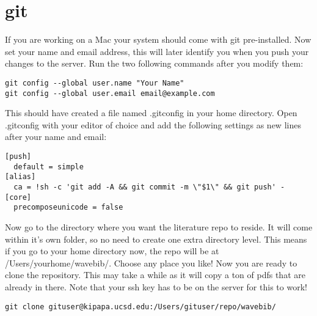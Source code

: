 \documentclass[11pt, oneside]{article}   	%
\begin{document}
\section{git}
If you are working on a Mac your system should come with git pre-installed. Now set your name and email address, this will later identify you when you push your changes to the server. Run the two following commands after you modify them:
\begin{verbatim}
git config --global user.name "Your Name"
git config --global user.email email@example.com
\end{verbatim}
This should have created a file named .gitconfig in your home directory. Open .gitconfig with your editor of choice and add the following settings as new lines after your name and email:
\begin{verbatim}
[push]
  default = simple
[alias]
  ca = !sh -c 'git add -A && git commit -m \"$1\" && git push' -
[core]
  precomposeunicode = false
\end{verbatim}

Now go to the directory where you want the literature repo to reside. It will come within it's own folder, so no need to create one extra directory level. This means if you go to your home directory now, the repo will be at /Users/yourhome/wavebib/. Choose any place you like! Now you are ready to clone the repository. This may take a while as it will copy a ton of pdfs that are already in there. Note that your ssh key has to be on the server for this to work!
\begin{verbatim}
git clone gituser@kipapa.ucsd.edu:/Users/gituser/repo/wavebib/
\end{verbatim}



%
%
%
%
%
%
%
%
%
%
\end{document}
